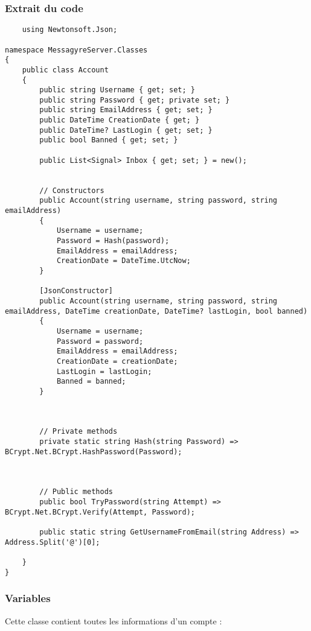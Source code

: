 \documentclass{article}
\begin{document}
\subsubsection{Extrait du code}
\begin{verbatim}
    using Newtonsoft.Json;

namespace MessagyreServer.Classes
{
    public class Account
    {
        public string Username { get; set; }
        public string Password { get; private set; }
        public string EmailAddress { get; set; }
        public DateTime CreationDate { get; }
        public DateTime? LastLogin { get; set; }
        public bool Banned { get; set; }

        public List<Signal> Inbox { get; set; } = new();


        // Constructors 
        public Account(string username, string password, string emailAddress)
        {
            Username = username;
            Password = Hash(password);
            EmailAddress = emailAddress;
            CreationDate = DateTime.UtcNow;
        }

        [JsonConstructor]
        public Account(string username, string password, string emailAddress, DateTime creationDate, DateTime? lastLogin, bool banned)
        {
            Username = username;
            Password = password;
            EmailAddress = emailAddress;
            CreationDate = creationDate;
            LastLogin = lastLogin;
            Banned = banned;
        }



        // Private methods 
        private static string Hash(string Password) => BCrypt.Net.BCrypt.HashPassword(Password);



        // Public methods 
        public bool TryPassword(string Attempt) => BCrypt.Net.BCrypt.Verify(Attempt, Password);

        public static string GetUsernameFromEmail(string Address) => Address.Split('@')[0];

    }
}
\end{verbatim}

\subsubsection{Variables}
Cette classe contient toutes les informations d'un compte :
\end{document}
